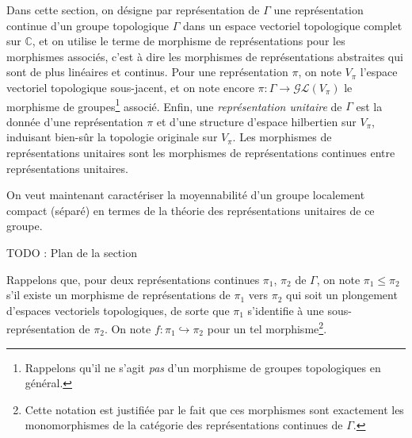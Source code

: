 \documentclass[a4paper,12pt]{article}
\newcommand{\C}{\mathbb{C}}
\newcommand{\TODO}[1]{{\color{red}TODO :} #1}
\begin{document}
Dans cette section, on désigne par \og{}représentation de $\Gamma$\fg{} une représentation continue d'un
groupe topologique $\Gamma$ dans un espace vectoriel topologique complet sur $\C$, et on utilise le terme de \og{}morphisme 
de représentations\fg{} pour les morphismes associés, c'est à dire les morphismes de représentations abstraites
qui sont de plus linéaires et continus. Pour une représentation $\pi$, on note $V_\pi$ l'espace 
vectoriel topologique sous-jacent, et on note encore $\pi : \Gamma\to\mathcal{GL}(V_\pi)$ le morphisme 
de groupes\footnote{Rappelons qu'il ne s'agit \emph{pas} d'un morphisme de groupes topologiques en général.} associé.
Enfin, une \emph{représentation unitaire} de $\Gamma$ est la donnée d'une représentation $\pi$ et d'une structure 
d'espace hilbertien sur $V_\pi$, induisant bien-sûr la topologie originale sur $V_\pi$. Les morphismes de représentations 
unitaires sont les morphismes de représentations continues entre représentations unitaires.

On veut maintenant caractériser la moyennabilité d'un groupe localement compact (séparé) en termes
de la théorie des représentations unitaires de ce groupe. 

\TODO{Plan de la section}

Rappelons que, pour deux représentations continues $\pi_1$, $\pi_2$ de $\Gamma$, on note 
$\pi_1\le\pi_2$ s'il existe un morphisme de représentations de $\pi_1$ vers $\pi_2$ qui soit un plongement
d'espaces vectoriels topologiques, de sorte que $\pi_1$ s'identifie à une sous-représentation de $\pi_2$.
On note $f : \pi_1\hookrightarrow\pi_2$ pour un tel morphisme\footnote{Cette notation est justifiée par le fait que ces morphismes
sont exactement les monomorphismes de la catégorie des représentations continues de $\Gamma$.}.
\end{document}
